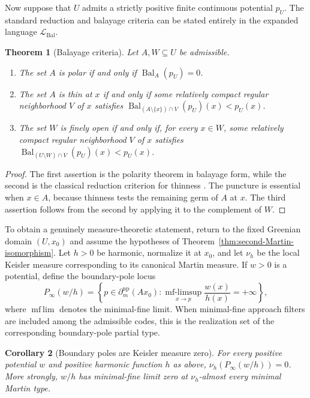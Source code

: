 \documentclass{amsart}
\newtheorem{theorem}{Theorem}[section]
\newtheorem{corollary}[theorem]{Corollary}
\theoremstyle{definition}
\theoremstyle{remark}
\numberwithin{equation}{section}
\begin{document}
Now suppose that $U$ admits a strictly positive finite continuous potential
$p_U$. The standard reduction and balayage criteria can be stated entirely in
the expanded language $\mathcal L_{\mathrm{Bal}}$.

\begin{theorem}[Balayage criteria]
\label{thm:balayage-polar-thin-fine}
Let $A,W\subseteq U$ be admissible.
\begin{enumerate}
	\item The set $A$ is polar if and only if
	$\operatorname{Bal}_A(p_U)=0$.
	
	\item The set $A$ is thin at $x$ if and only if some relatively compact
	regular neighborhood $V$ of $x$ satisfies
	$\operatorname{Bal}_{(A\setminus\{x\})\cap V}(p_U)(x)<p_U(x)$.
	
	\item The set $W$ is finely open if and only if, for every $x\in W$, some
	relatively compact regular neighborhood $V$ of $x$ satisfies
	$\operatorname{Bal}_{(U\setminus W)\cap V}(p_U)(x)<p_U(x)$.
\end{enumerate}
\end{theorem}

\begin{proof}
The first assertion is the polarity theorem in balayage form, while the
second is the classical reduction criterion for thinness
\cite{doob1984classical}. The puncture is essential when $x\in A$, because
thinness tests the remaining germ of $A$ at $x$. The third assertion follows
from the second by applying it to the complement of $W$.
\end{proof}

To obtain a genuinely measure-theoretic statement, return to the fixed Greenian domain $(U,x_0)$ and assume the hypotheses of Theorem~\ref{thm:second-Martin-isomorphism}. Let $h>0$ be harmonic, normalize it at $x_0$, and let $\nu_h$ be the local Keisler measure corresponding to its canonical Martin measure. If $w>0$ is a potential, define the boundary-pole locus
$$P_\infty(w/h)=\left\{p\in\partial_m^{\mathrm{np}}(Ax_0):\operatorname*{mf-\limsup}_{x\to p}\frac{w(x)}{h(x)}=+\infty\right\},$$
where $\operatorname{mf\!\!\lim}$ denotes the minimal-fine limit. When minimal-fine approach filters are included among the admissible codes, this is the realization set of the corresponding boundary-pole partial type.

\begin{corollary}[Boundary poles are Keisler measure zero]
\label{cor:Keisler-polar-characterization}
For every positive potential $w$ and positive harmonic function $h$ as above, $\nu_h(P_\infty(w/h))=0$. More strongly, $w/h$ has minimal-fine limit zero at $\nu_h$-almost every minimal Martin type.
\end{corollary}
\end{document}
